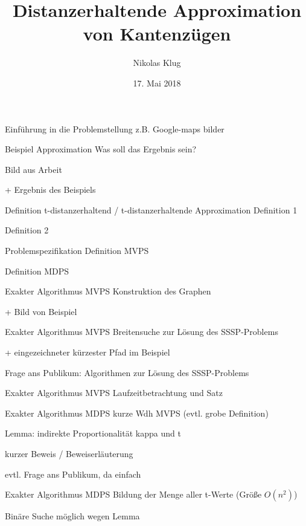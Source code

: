 \documentclass{beamer}
\title[Distanzerhaltende Approximation]{Distanzerhaltende Approximation von Kantenzügen}
\author[N. Klug]{Nikolas Klug}
\institute[Uni Augburg]{Universität Augsburg}
\date{17. Mai 2018}
\begin{document}
	\frame{\titlepage}
	
	\begin{frame}{Einführung in die Problemstellung}
		z.B. Google-maps bilder
		
	\end{frame}
	
	\begin{frame}{Beispiel Approximation}
		Was soll das Ergebnis sein?
		
		Bild aus Arbeit
		
		 + Ergebnis des Beispiels
	\end{frame}
	
	\begin{frame}{Definition t-distanzerhaltend / t-distanzerhaltende Approximation}
		Definition 1
		
		Definition 2
	\end{frame}
	
	\begin{frame}{Problemspezifikation}
		Definition MVPS
		
		Definition MDPS
	\end{frame}
	
	\begin{frame}{Exakter Algorithmus MVPS}
		Konstruktion des Graphen
		
		+ Bild von Beispiel
		
	\end{frame}
	
	\begin{frame}{Exakter Algorithmus MVPS}
		Breitensuche zur Lösung des SSSP-Problems
		
		+ eingezeichneter kürzester Pfad im Beispiel
		
		Frage ans Publikum: Algorithmen zur Lösung des SSSP-Problems
	\end{frame}
	
	\begin{frame}{Exakter Algorithmus MVPS}
		Laufzeitbetrachtung und Satz
	\end{frame}
	
	\begin{frame}{Exakter Algorithmus MDPS}
		kurze Wdh MVPS (evtl. grobe Definition)
		
		Lemma: indirekte Proportionalität kappa und t
		
		kurzer Beweis / Beweiserläuterung
		
		evtl. Frage ans Publikum, da einfach
	\end{frame}
	
	\begin{frame}{Exakter Algorithmus MDPS}
		Bildung der Menge aller t-Werte (Größe $O(n^2)$)
		
		Binäre Suche möglich wegen Lemma
		
	\end{frame}
	
\end{document}
